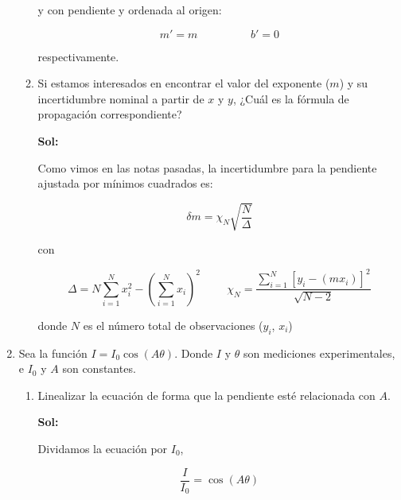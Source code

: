\documentclass[12pt,a4paper]{article}
\begin{document}
\begin{enumerate}
\begin{enumerate}
    y con pendiente y ordenada al origen:
    
    \begin{equation*}
        m' = m \hspace{2cm} b' = 0
    \end{equation*}
    
    respectivamente.
    
    
    
    \item Si estamos interesados en encontrar el valor del exponente ($m$) y su incertidumbre nominal a partir de $x$ y $y$, ¿Cuál es la fórmula de propagación correspondiente?
    
    \textbf{Sol:}
    
    Como vimos en las notas pasadas, la incertidumbre para la pendiente ajustada por mínimos cuadrados es:
    
    \begin{equation*}
        \delta m = \chi_N \sqrt{\frac{N}{\Delta}}
    \end{equation*}
    
    con 
    
    \begin{equation*}
        \Delta  = N \sum_{i=1}^{N} x_{i}^{2} - \left(\sum_{i=1}^{N} x_i\right)^2 \hspace{1cm} \chi_N = \frac{\sum_{i=1}^{N} [y_i - (mx_i )]^2}{\sqrt{N-2}}
    \end{equation*}
    
    donde $N$ es el número total de observaciones ($y_i$, $x_i$) 
    
\end{enumerate}






\item Sea la función $I = I_0 \cos{(A\theta)}$. Donde $I$ y $\theta$ son mediciones experimentales, e $I_0$ y $A$ son constantes.

\begin{enumerate}
    \item Linealizar la ecuación de forma que la pendiente esté relacionada con $A$.
    
    \textbf{Sol:}
    
    Dividamos la ecuación por $I_0$,
    
    \begin{equation*}
        \frac{I}{I_0} = \cos{(A\theta)}
    \end{equation*}
    

\end{enumerate}
\end{enumerate}
\end{document}
